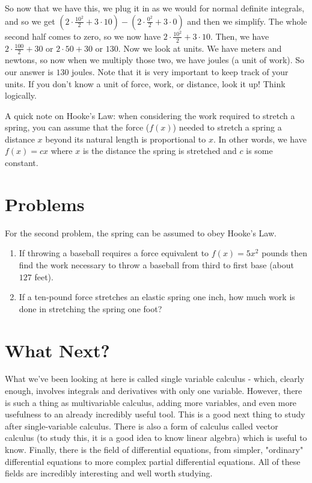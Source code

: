 So now that we have this, we plug it in as we would for normal definite integrals, and so we get $(2\cdot\frac{10^2}{2}+3\cdot 10) - (2\cdot\frac{0^2}{2}+3\cdot 0)$ and then we simplify. 
The whole second half comes to zero, so we now have $2\cdot\frac{10^2}{2}+3\cdot 10$. 
Then, we have $2\cdot \frac{100}{2}+ 30$ or $2\cdot 50 + 30$ or $130$. 
Now we look at units. 
We have meters and newtons, so now when we multiply those two, we have joules (a unit of work). 
So our answer is $130$ joules. 
Note that it is very important to keep track of your units. If you don't know a unit of force, work, or distance, look it up! Think logically.

A quick note on Hooke's Law: when considering the work required to stretch a spring, you can assume that the force ($f(x)$) needed to stretch a spring a distance $x$ beyond its natural length is proportional to $x$. 
In other words, we have $f(x) = cx$ where $x$ is the distance the spring is stretched and $c$ is some constant.

\chapter{Problems}
For the second problem, the spring can be assumed to obey Hooke's Law.

\begin{enumerate}
    \item If throwing a baseball requires a force equivalent to $f(x) = 5x^2$ pounds then find the work necessary to throw a baseball from third to first base (about $127$ feet).
    \item If a ten-pound force stretches an elastic spring one inch, how much work is done in stretching the spring one foot?
\end{enumerate}

\chapter{What Next?}

What we've been looking at here is called single variable calculus - which, clearly enough, involves integrals and derivatives with only one variable. 
However, there is such a thing as multivariable calculus, adding more variables, and even more usefulness to an already incredibly useful tool. 
This is a good next thing to study after single-variable calculus. 
There is also a form of calculus called vector calculus (to study this, it is a good idea to know
linear algebra) which is useful to know. 
Finally, there is the field of differential equations, from simpler, "ordinary" differential equations to more complex partial differential equations. 
All of these fields are incredibly interesting and well worth studying.
